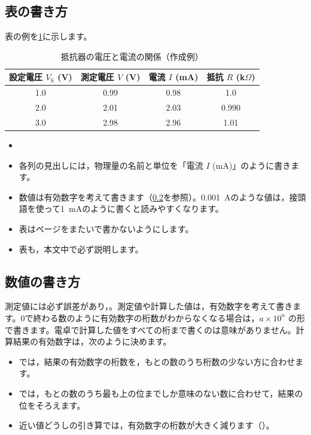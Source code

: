 \subsection{表の書き方}

表の例を\cref{tab:report-example}に示します。

\begin{table}[htbp]
  \centering
  \caption{抵抗器の電圧と電流の関係（作成例）}
  \label{tab:report-example}
  \begin{tabular}{cccc}
    \toprule
    設定電圧 $V_\mathrm{S}$ (V) & 測定電圧 $V$ (V) & 電流 $I$ (mA) & 抵抗 $R$ (k$\Omega$) \\
    \midrule
    1.0 & 0.99 & 0.98 & 1.0 \\
    2.0 & 2.01 & 2.03 & 0.990 \\
    3.0 & 2.98 & 2.96 & 1.01 \\
    \bottomrule
  \end{tabular}
\end{table}

\begin{itemize}
  \item {}
  \item 各列の見出しには，物理量の名前と単位を「電流 $I$ (mA)」のように書きます。
  \item 数値は有効数字を考えて書きます（\cref{sec:report-numbers}を参照）。\SI{0.001}{A}のような値は，接頭語を使って\SI{1}{mA}のように書くと読みやすくなります。
  \item 表はページをまたいで書かないようにします。
  \item 表も，本文中で必ず説明します。
\end{itemize}

\subsection{数値の書き方}
\label{sec:report-numbers}

測定値には必ず誤差があり，。測定値や計算した値は，有効数字を考えて書きます。0で終わる数のように有効数字の桁数がわからなくなる場合は，$a\times10^{n}$ の形で書きます。電卓で計算した値をすべての桁まで書くのは意味がありません。計算結果の有効数字は，次のように決めます。
\begin{itemize}
  \item {}では，結果の有効数字の桁数を，もとの数のうち桁数の少ない方に合わせます。
  \item {}では，もとの数のうち最も上の位までしか意味のない数に合わせて，結果の位をそろえます。
  \item 近い値どうしの引き算では，有効数字の桁数が大きく減ります（）。
\end{itemize}

